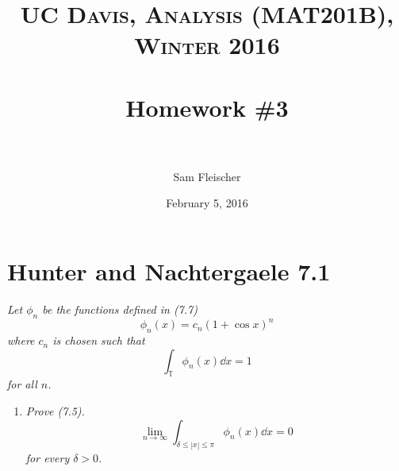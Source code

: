 \documentclass[paper=a4, fontsize=11pt]{scrartcl} %
\title{ 
\normalfont \normalsize 
\textsc{UC Davis, Analysis (MAT201B), Winter 2016} \\ [25pt] %
\horrule{2pt} \\[0.4cm] %
\Huge Homework \#3 \\ %
\horrule{2pt} \\[0.5cm] %
}
\author{\huge Sam Fleischer} %
\date{February 5, 2016} %
\theoremstyle{plain}
\numberwithin{equation}{section} %
\numberwithin{figure}{section} %
\numberwithin{table}{section} %
\begin{document}
\thispagestyle{empty}

\maketitle %

\makeatletter
{}
\makeatother

\pagebreak

\section{Hunter and Nachtergaele 7.1}
\emph{Let $\phi_n$ be the functions defined in (7.7) $$\phi_n(x) = c_n(1 + \cos x)^n$$ where $c_n$ is chosen such that $$\int_\mathbb{T}\phi_n(x) \dd x = 1$$ for all $n$.}
\begin{enumerate}[\bf (a)]
    \item
        \emph{Prove (7.5).  $$\lim_{n\rightarrow \infty}\int_{\delta\leq|x|\leq \pi}\phi_n(x) \dd x = 0$$ for every $\delta > 0$.} \\


\end{enumerate}
\end{document}
